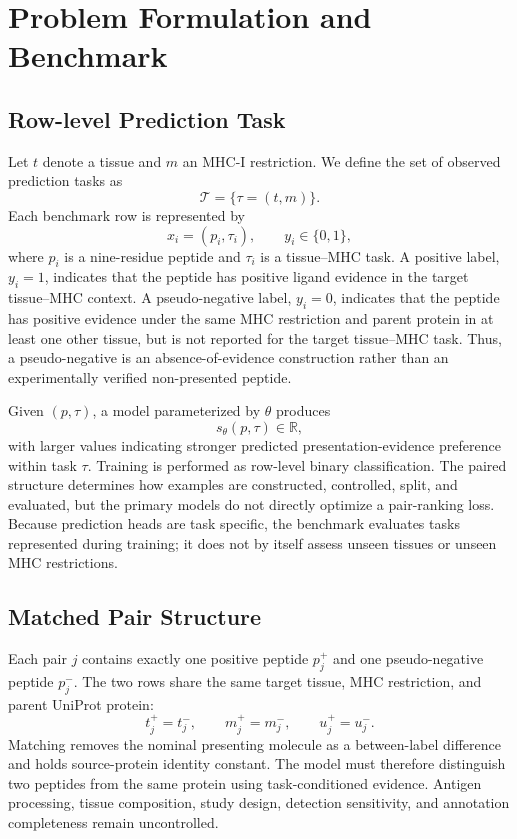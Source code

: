 \section{Problem Formulation and Benchmark}

\subsection{Row-level Prediction Task}

Let \(t\) denote a tissue and \(m\) an MHC-I restriction. We define the set of observed prediction tasks as
\[
\mathcal{T}=\{\tau=(t,m)\}.
\]
Each benchmark row is represented by
\[
x_i=(p_i,\tau_i), \qquad y_i\in\{0,1\},
\]
where \(p_i\) is a nine-residue peptide and \(\tau_i\) is a tissue--MHC task. A positive label, \(y_i=1\), indicates that the peptide has positive ligand evidence in the target tissue--MHC context. A pseudo-negative label, \(y_i=0\), indicates that the peptide has positive evidence under the same MHC restriction and parent protein in at least one other tissue, but is not reported for the target tissue--MHC task. Thus, a pseudo-negative is an absence-of-evidence construction rather than an experimentally verified non-presented peptide.

Given \((p,\tau)\), a model parameterized by \(\theta\) produces
\[
s_{\theta}(p,\tau)\in\mathbb{R},
\]
with larger values indicating stronger predicted presentation-evidence preference within task \(\tau\). Training is performed as row-level binary classification. The paired structure determines how examples are constructed, controlled, split, and evaluated, but the primary models do not directly optimize a pair-ranking loss. Because prediction heads are task specific, the benchmark evaluates tasks represented during training; it does not by itself assess unseen tissues or unseen MHC restrictions.

\subsection{Matched Pair Structure}

Each pair \(j\) contains exactly one positive peptide \(p_j^{+}\) and one pseudo-negative peptide \(p_j^{-}\). The two rows share the same target tissue, MHC restriction, and parent UniProt protein:
\[
t_j^{+}=t_j^{-}, \qquad
m_j^{+}=m_j^{-}, \qquad
u_j^{+}=u_j^{-}.
\]
Matching removes the nominal presenting molecule as a between-label difference and holds source-protein identity constant. The model must therefore distinguish two peptides from the same protein using task-conditioned evidence. Antigen processing, tissue composition, study design, detection sensitivity, and annotation completeness remain uncontrolled.

